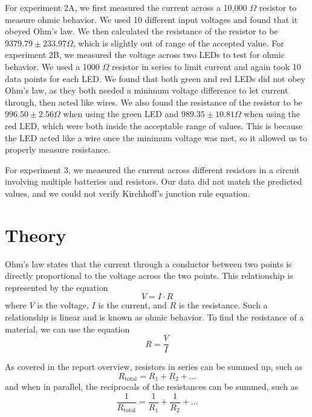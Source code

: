 \documentclass[11pt]{article}
\let\oldsection\section
\renewcommand\section{\clearpage\oldsection}
\begin{document}
    For experiment 2A, we first measured the current across a 10,000 $\Omega$ resistor to measure ohmic behavior.
    We used 10 different input voltages and found that it obeyed Ohm's law.
    We then calculated the resistance of the resistor to be $9379.79 \pm 233.97 \Omega$, which is slightly out of range of the accepted value.
    For experiment 2B, we measured the voltage across two LEDs to test for ohmic behavior.
    We used a 1000 $\Omega$ resistor in series to limit current and again took 10 data points for each LED\@.
    We found that both green and red LEDs did not obey Ohm's law, as they both needed a minimum voltage difference to let current through, then acted like wires.
    We also found the resistance of the resistor to be $996.50 \pm 2.56 \Omega$ when using the green LED and $989.35 \pm 10.81 \Omega$ when using the red LED, which were both inside the acceptable range of values.
    This is because the LED acted like a wire once the minimum voltage was met, so it allowed us to properly measure resistance.

    For experiment 3, we measured the current across different resistors in a circuit involving multiple batteries and resistors.
    Our data did not match the predicted values, and we could not verify Kirchhoff's junction rule equation.
    
    \section*{Theory}\label{sec:theory}
    Ohm's law states that the current through a conductor between two points is directly proportional to the voltage across the two points.
    This relationship is represented by the equation
    \begin{equation}\label{eq:ohm_equation}
        V = I \cdot R
    \end{equation}
    where $V$ is the voltage, $I$ is the current, and $R$ is the resistance.
    Such a relationship is linear and is known as ohmic behavior.
    To find the resistance of a material, we can use the equation
    \begin{equation}\label{eq:resistance_equation}
        R = \frac{V}{I}
    \end{equation}

    As covered in the report overview, resistors in series can be summed up, such as
    \begin{equation}\label{eq:resistors_in_series}
        R_{\text{total}} = R_1 + R_2 + \ldots
    \end{equation}
    and when in parallel, the reciprocals of the resistances can be summed, such as
    \begin{equation}\label{eq:resistors_in_parallel}
        \frac{1}{R_{\text{total}}} = \frac{1}{R_1} + \frac{1}{R_2} + \ldots
    \end{equation}
\end{document}
